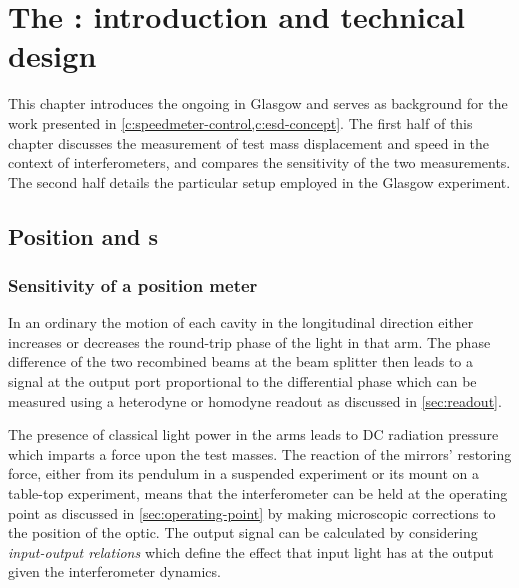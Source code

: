 \chapter{\label{c:speedmeter-intro}The \SSMEXPT{}: introduction and technical design}

This chapter introduces the ongoing \SSMEXPT{} in Glasgow and serves as background for the work presented in \cref{c:speedmeter-control,c:esd-concept}. The first half of this chapter discusses the measurement of test mass displacement and speed in the context of interferometers, and compares the sensitivity of the two measurements. The second half details the particular setup employed in the Glasgow experiment.

\section{\label{sec:pos-speed-meters}Position and \SM{}s}

\subsection{\label{sec:position-meter-measurement}Sensitivity of a position meter}
In an ordinary \FPMI{} the motion of each cavity in the longitudinal direction either increases or decreases the round-trip phase of the light in that arm. The phase difference of the two recombined beams at the beam splitter then leads to a signal at the output port proportional to the differential phase which can be measured using a heterodyne or homodyne readout as discussed in \cref{sec:readout}.

The presence of classical light power in the arms leads to \gls{DC} radiation pressure which imparts a force upon the test masses. The reaction of the mirrors' restoring force, either from its pendulum in a suspended experiment or its mount on a table-top experiment, means that the interferometer can be held at the operating point as discussed in \cref{sec:operating-point} by making microscopic corrections to the position of the optic. The output signal can be calculated by considering \emph{input-output relations} which define the effect that input light has at the output given the interferometer dynamics.

